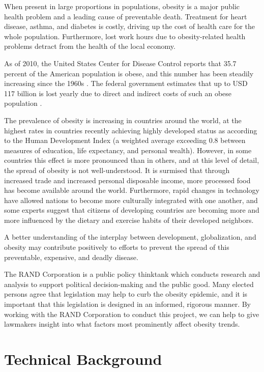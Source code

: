 \documentclass[oneside,12pt]{report}
\begin{document}
When present in large proportions in populations, obesity is a major public health problem and a leading cause of preventable death. Treatment for heart disease, asthma, and diabetes is costly, driving up the cost of health care for the whole population. Furthermore, lost work hours due to obesity-related health problems detract from the health of the local economy.

As of 2010, the United States Center for Disease Control reports that 35.7 percent of the American population is obese, and this number has been steadily increasing since the 1960s \cite{prevalence}. The federal government estimates that up to USD 117 billion is lost yearly due to direct and indirect costs of such an obese population \cite{prevalence}.

The prevalence of obesity is increasing in countries around the world, at the highest rates in countries recently achieving highly developed status as according to the Human Development Index (a weighted average exceeding 0.8 between measures of education, life expectancy, and personal wealth). However, in some countries this effect is more pronounced than in others, and at this level of detail, the spread of obesity is not well-understood. It is surmised that through increased trade and increased personal disposable income, more processed food has become available around the world. Furthermore, rapid changes in technology have allowed nations to become more culturally integrated with one another, and some experts suggest that citizens of developing countries are becoming more and more influenced by the dietary and exercise habits of their developed neighbors.

A better understanding of the interplay between development, globalization, and obesity may contribute positively to efforts to prevent the spread of this preventable, expensive, and deadly disease.

The RAND Corporation is a public policy thinktank which conducts research and analysis to support political decision-making and the public good. Many elected persons agree that legislation may help to curb the obesity epidemic, and it is important that this legislation is designed in an informed, rigorous manner. By working with the RAND Corporation to conduct this project, we can help to give lawmakers insight into what factors most prominently affect obesity trends.

\chapter{Technical Background}
\end{document}
